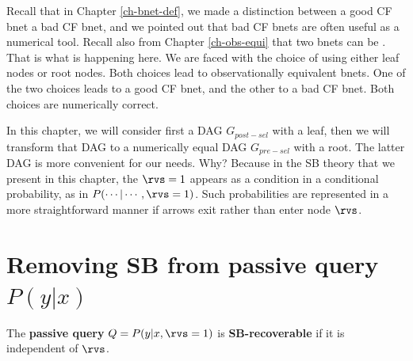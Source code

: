 Recall that in Chapter \ref{ch-bnet-def},
we made a distinction
between a good CF bnet
a bad CF bnet, and
we pointed out
that bad CF bnets are
often useful as
a numerical tool.
Recall also from Chapter
\ref{ch-obs-equi}
that two bnets can be
.
That is what is happening here.
We are faced with
the choice of
using
either
leaf nodes or root nodes.
Both
choices  lead to observationally
equivalent bnets.
One of the two choices
leads to a good
CF bnet,
and the other to a bad CF bnet.
Both choices are numerically
correct.

In this
chapter,
we will consider
first a DAG $G_{post-sel}$
with a leaf,
then we will transform that
DAG to a numerically equal
DAG $G_{pre-sel}$
with a root.
The latter DAG
is more convenient
for our needs. Why?
Because
in the SB theory
that we present in this chapter, the
$\rvs=1$
appears as a condition in a conditional
probability,
as in $P(\cdots|\cdots, \rvs=1)$.
Such probabilities
are represented  in a more
straightforward manner if arrows
exit rather than enter node
$\rvs$.




\section{Removing SB from
passive query $P(y|x)$}

The {\bf  passive query} $Q=P(y|x, \rvs=1)$
is {\bf SB-recoverable}
if it is independent of $\rvs$.








